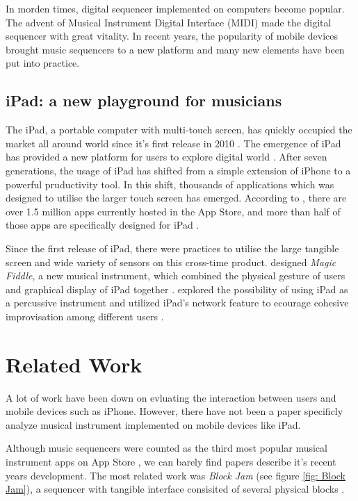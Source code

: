 In morden times, digital sequencer implemented on computers become popular. The advent of Musical Instrument Digital Interface (MIDI) made the digital sequencer with great vitality. In recent years, the popularity of mobile devices brought music sequencers to a new platform and many new elements have been put into practice.

\subsection{iPad: a new playground for musicians}
\label{subsec: iPad}

The iPad, a portable computer with multi-touch screen, has quickly occupied the market all around world since it's first release in 2010 \citep{Reference2}. The emergence of iPad has provided a new platform for users to explore digital world \citep{Reference1}. After seven generations, the usage of iPad has shifted from a simple extension of iPhone to a powerful pruductivity tool. In this shift, thousands of applications which was designed to utilise the larger touch screen has emerged. According to \citeauthor{lifewire}, there are over 1.5 million apps currently hosted in the App Store, and more than half of those apps are specifically designed for iPad \citep{lifewire}.

Since the first release of iPad, there were practices to utilise the large tangible screen and wide variety of sensors on this cross-time product. \citeauthor{Reference8.4} designed \textit{Magic Fiddle}, a new musical instrument, which combined the physical gesture of users and graphical display of iPad together \citep{Reference8.4}. \citeauthor{Reference19} explored the possibility of using iPad as a percussive instrument and utilized iPad's network feature to ecourage cohesive improvisation among different users \citep{Reference19}.

\section{Related Work}

A lot of work have been down on evluating the interaction between users and mobile devices such as iPhone. However, there have not been a paper specificly analyze musical instrument implemented on mobile devices like iPad.

Although music sequencers were counted as the third most popular musical instrument apps on App Store \citep{Reference14}, we can barely find papers describe it's recent years development. The most related work was \textit{Block Jam} (see figure \ref{fig: Block Jam}), a sequencer with tangible interface consisited of several physical blocks \citep{Reference20}.

